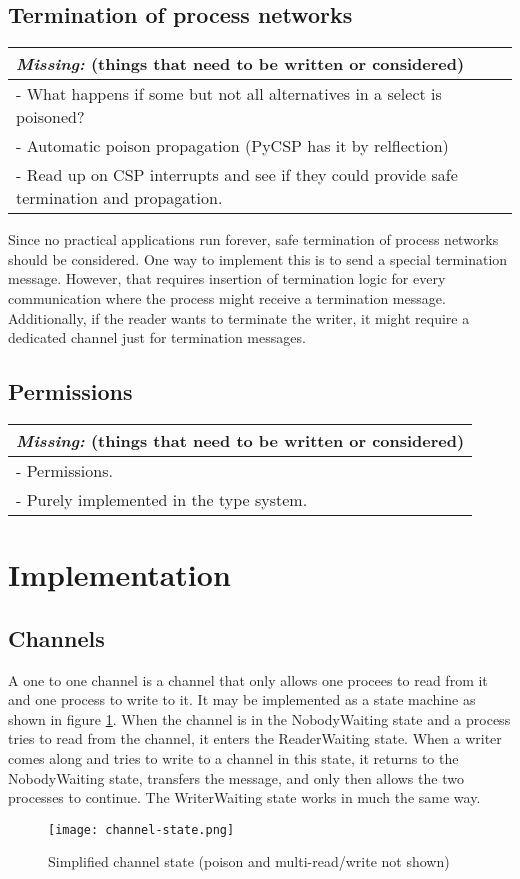 \documentclass[a4paper,12pt]{article}
\newcommand{\missing}[1]{
\begin{tabular}{|p{11cm}|}
\hline
\emph{Missing:} {\scriptsize (things that need to be written or considered)} \\
\hline
#1
\hline
\end{tabular}
}
\begin{document}
\subsection{Termination of process networks}
\missing{
- What happens if some but not all alternatives in a select is poisoned? \\
- Automatic poison propagation (PyCSP has it by relflection)\\
- Read up on CSP interrupts and see if they could provide safe termination and propagation.\\
}

Since no practical applications run forever, safe termination of process networks should be considered.
One way to implement this is to send a special termination message. However, that requires insertion of 
termination logic for every communication where the process might receive a termination message.
Additionally, if the reader wants to terminate the writer, it might require a dedicated channel 
just for termination messages.

\subsection{Permissions}
\missing{
- Permissions.\\
- Purely implemented in the type system.\\
}

\section{Implementation}
\label{implementation}


\subsection{Channels}
A one to one channel is a channel that only allows one procees to read from it and one process 
to write to it. It may be implemented as a state machine as shown in figure \ref{channel-state}.
When the channel is in the NobodyWaiting state and a process tries to read from the channel,
it enters the ReaderWaiting state. When a writer comes along and tries to write to a channel
in this state, it returns to the NobodyWaiting state, transfers the message, and only then
allows the two processes to continue. The WriterWaiting state works in much the same way.

\begin{figure}[h]
\centering
\texttt{[image: channel-state.png]}
\caption{Simplified channel state (poison and multi-read/write not shown)}
\label{channel-state}
\end{figure}
\end{document}
